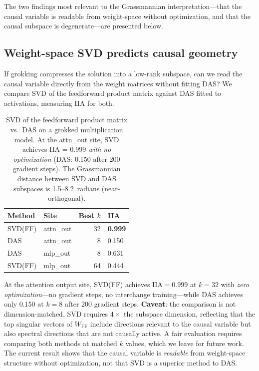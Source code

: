 \documentclass{article}
\newcommand{\IIA}{\mathrm{IIA}}
\begin{document}
The two findings most relevant to the Grassmannian interpretation---that
the causal variable is readable from weight-space without optimization,
and that the causal subspace is degenerate---are presented below.

\subsection{Weight-space SVD predicts causal geometry}
\label{sec:svd_vs_das}

If grokking compresses the solution into a low-rank subspace, can we read the
causal variable directly from the weight matrices without fitting DAS? We
compare SVD of the feedforward product matrix against DAS fitted to
activations, measuring IIA for both.

\begin{table}[t]
\centering
\small
\begin{tabular}{llrl}
\toprule
Method & Site & Best $k$ & IIA \\
\midrule
SVD(FF) & attn\_out & 32 & \textbf{0.999} \\
DAS     & attn\_out & 8  & 0.150 \\
DAS     & mlp\_out  & 8  & 0.631 \\
SVD(FF) & mlp\_out  & 64 & 0.444 \\
\bottomrule
\end{tabular}
\caption{SVD of the feedforward product matrix vs.\ DAS on a grokked
multiplication model. At the attn\_out site, SVD achieves IIA = 0.999
\emph{with no optimization} (DAS: 0.150 after 200 gradient steps).
The Grassmannian distance between SVD and DAS subspaces is
1.5--8.2~radians (near-orthogonal).}
\label{tab:svd_vs_das}
\end{table}

At the attention output site, SVD(FF) achieves $\IIA = 0.999$ at $k = 32$
with \emph{zero optimization}---no gradient steps, no interchange
training---while DAS achieves only 0.150 at $k = 8$ after 200 gradient
steps. \textbf{Caveat}: the comparison is not dimension-matched. SVD
requires $4\times$ the subspace dimension, reflecting that the top singular
vectors of $W_\text{FF}$ include directions relevant to the causal variable
but also spectral directions that are not causally active. A fair evaluation
requires comparing both methods at matched $k$ values, which we leave for
future work. The current result shows that the causal variable is
\emph{readable} from weight-space structure without optimization, not that
SVD is a superior method to DAS.
\end{document}
